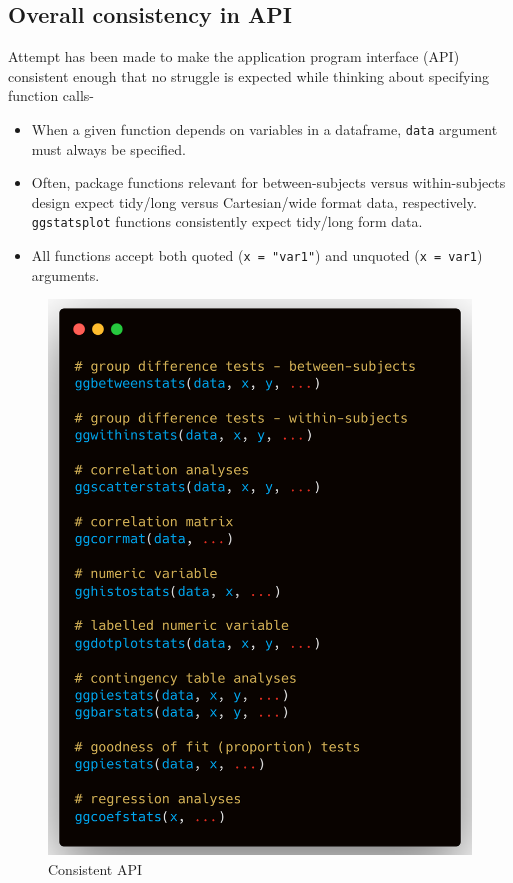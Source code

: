 \documentclass[
]{article}
\providecommand{\tightlist}{%
  \setlength{\itemsep}{0pt}\setlength{\parskip}{0pt}}
\begin{document}
\hypertarget{overall-consistency-in-api}{%
\subsection{Overall consistency in API}\label{overall-consistency-in-api}}

Attempt has been made to make the application program interface (API) consistent
enough that no struggle is expected while thinking about specifying function
calls-

\begin{itemize}
\tightlist
\item
  When a given function depends on variables in a dataframe, \texttt{data} argument
  must always be specified.
\item
  Often, package functions relevant for between-subjects versus
  within-subjects design expect tidy/long versus Cartesian/wide format data,
  respectively. \texttt{ggstatsplot} functions consistently expect tidy/long form
  data.
\item
  All functions accept both quoted (\texttt{x\ =\ "var1"}) and unquoted (\texttt{x\ =\ var1})
  arguments.
\end{itemize}

\begin{figure}
\centering
\includegraphics{figures/arguments.png}
\caption{Consistent API}
\end{figure}
\end{document}

